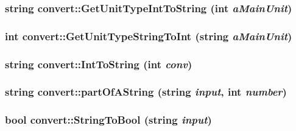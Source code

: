 \label{classconvert_a6acbe29be64d48889f62d442e2aa62f2}
\hypertarget{classconvert_ab5846cd273928b43424ee716b6a302d8}{
\subsubsection[{GetUnitTypeIntToString}]{\setlength{\rightskip}{0pt plus 5cm}string convert::GetUnitTypeIntToString (int {\em aMainUnit})}}
\label{classconvert_ab5846cd273928b43424ee716b6a302d8}
\hypertarget{classconvert_a9dd6fb1311ba8af2a6d33f1b370b4cbc}{
\subsubsection[{GetUnitTypeStringToInt}]{\setlength{\rightskip}{0pt plus 5cm}int convert::GetUnitTypeStringToInt (string {\em aMainUnit})}}
\label{classconvert_a9dd6fb1311ba8af2a6d33f1b370b4cbc}
\hypertarget{classconvert_a15b1798af013fa0fe978f3253e0c12e4}{
\subsubsection[{IntToString}]{\setlength{\rightskip}{0pt plus 5cm}string convert::IntToString (int {\em conv})}}
\label{classconvert_a15b1798af013fa0fe978f3253e0c12e4}
\hypertarget{classconvert_a769ad855968f46036c456171a28c4a50}{
\subsubsection[{partOfAString}]{\setlength{\rightskip}{0pt plus 5cm}string convert::partOfAString (string {\em input}, \/  int {\em number})}}
\label{classconvert_a769ad855968f46036c456171a28c4a50}
\hypertarget{classconvert_a06228e8cf1a860110b210a46f9ce1eaa}{
\subsubsection[{StringToBool}]{\setlength{\rightskip}{0pt plus 5cm}bool convert::StringToBool (string {\em input})}}

